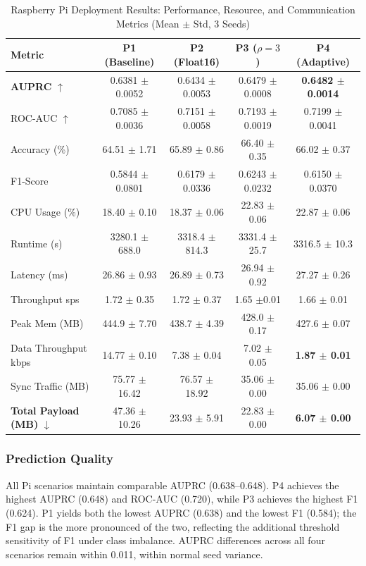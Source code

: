 \documentclass[conference]{IEEEtran}
\begin{document}
\begin{table}[htbp]
\caption{Raspberry Pi Deployment Results: Performance, Resource, and Communication Metrics (Mean $\pm$ Std, 3 Seeds)}
\label{tab:pi_results_detail}
\centering
\begin{small}
\begin{tabular}{lcccc}
\toprule
\textbf{Metric} & \textbf{P1 (Baseline)} & \textbf{P2 (Float16)} & \textbf{P3 ($\rho{=}3$)} & \textbf{P4 (Adaptive)} \\
\midrule
\textbf{AUPRC} $\uparrow$ & 0.6381 $\pm$ 0.0052 & 0.6434 $\pm$ 0.0053 & 0.6479 $\pm$ 0.0008 & \textbf{0.6482 $\pm$ 0.0014} \\
ROC-AUC $\uparrow$ & 0.7085 $\pm$ 0.0036 & 0.7151 $\pm$ 0.0058 & 0.7193 $\pm$ 0.0019 & 0.7199 $\pm$ 0.0041 \\
Accuracy (\%) & 64.51 $\pm$ 1.71 & 65.89 $\pm$ 0.86 & 66.40 $\pm$ 0.35 & 66.02 $\pm$ 0.37 \\
F1-Score & 0.5844 $\pm$ 0.0801 & 0.6179 $\pm$ 0.0336 & 0.6243 $\pm$ 0.0232 & 0.6150 $\pm$ 0.0370 \\
\midrule
CPU Usage (\%) & 18.40 $\pm$ 0.10 & 18.37 $\pm$ 0.06 & 22.83 $\pm$ 0.06 & 22.87 $\pm$ 0.06 \\
Runtime (s) & 3280.1 $\pm$ 688.0 & 3318.4 $\pm$ 814.3 & 3331.4 $\pm$ 25.7 & 3316.5 $\pm$ 10.3 \\
Latency (ms) & 26.86 $\pm$ 0.93 & 26.89 $\pm$ 0.73 & 26.94 $\pm$ 0.92 & 27.27 $\pm$ 0.26 \\
Throughput sps & 1.72 $\pm$ 0.35 & 1.72 $\pm$ 0.37 &1.65 $\pm$0.01 & 1.66 $\pm$ 0.01 \\
Peak Mem (MB) & 444.9 $\pm$ 7.70 & 438.7 $\pm$ 4.39 & 428.0 $\pm$ 0.17 & 427.6 $\pm$ 0.07 \\
\midrule
Data Throughput kbps & 14.77 $\pm$ 0.10 & 7.38 $\pm$ 0.04 & 7.02 $\pm$ 0.05 & \textbf{1.87 $\pm$ 0.01} \\
Sync Traffic (MB) & 75.77 $\pm$ 16.42 & 76.57 $\pm$ 18.92 & 35.06 $\pm$ 0.00 & 35.06 $\pm$ 0.00 \\
\textbf{Total Payload (MB)} $\downarrow$ & 47.36 $\pm$ 10.26 & 23.93 $\pm$ 5.91 & 22.83 $\pm$ 0.00 & \textbf{6.07 $\pm$ 0.00} \\
\bottomrule
\end{tabular}
\end{small}
\end{table}

\subsubsection{Prediction Quality}
All Pi scenarios maintain comparable AUPRC (0.638--0.648). P4 achieves the highest AUPRC (0.648) and ROC-AUC (0.720), while P3 achieves the highest F1 (0.624). P1 yields both the lowest AUPRC (0.638) and the lowest F1 (0.584); the F1 gap is the more pronounced of the two, reflecting the additional threshold sensitivity of F1 under class imbalance. AUPRC differences across all four scenarios remain within 0.011, within normal seed variance.
\end{document}
